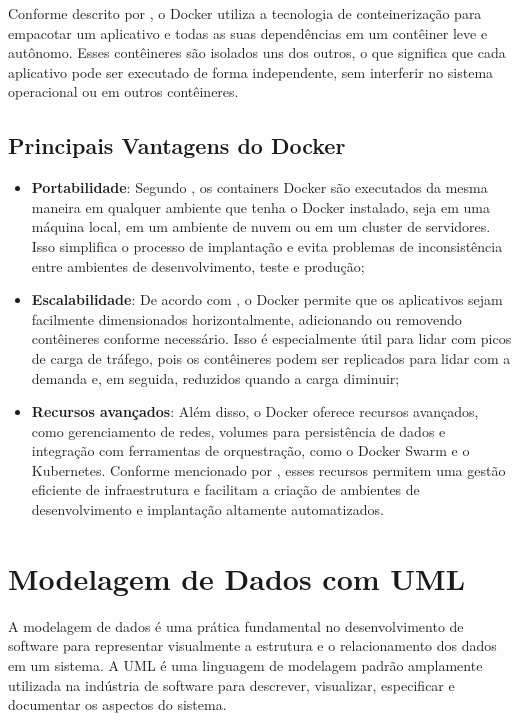 Conforme descrito por \cite{Boettiger2015}, o Docker utiliza a tecnologia de conteinerização para empacotar um aplicativo e todas as suas dependências em um contêiner leve e
autônomo. Esses contêineres são isolados uns dos outros, o que significa que cada aplicativo
pode ser executado de forma independente, sem interferir no sistema operacional ou em outros
contêineres.

\subsection*{Principais Vantagens do Docker}

\begin{itemize}
    \item \textbf{Portabilidade}: Segundo \cite{turner2019docker}, os containers Docker são executados da mesma maneira em qualquer ambiente que tenha o Docker instalado, seja em uma máquina local, em um ambiente de nuvem ou em um cluster de servidores. Isso simplifica o processo de implantação e evita problemas de inconsistência entre ambientes de desenvolvimento, teste e produção;

    \item \textbf{Escalabilidade}: De acordo com \cite{Muller2018}, o Docker permite que os aplicativos sejam facilmente dimensionados horizontalmente, adicionando ou removendo contêineres conforme necessário. Isso é especialmente útil para lidar com picos de carga de tráfego, pois os contêineres podem ser replicados para lidar com a demanda e, em seguida, reduzidos quando a carga diminuir;

    \item \textbf{Recursos avançados}: Além disso, o Docker oferece recursos avançados, como gerenciamento de redes, volumes para persistência de dados e integração com ferramentas de orquestração, como o Docker Swarm e o Kubernetes. Conforme mencionado por \cite{Matsumoto2017}, esses recursos permitem uma gestão eficiente de infraestrutura e facilitam a criação de ambientes de desenvolvimento e implantação altamente automatizados.
\end{itemize}

\section*{Modelagem de Dados com UML}

A modelagem de dados é uma prática fundamental no desenvolvimento de software para
representar visualmente a estrutura e o relacionamento dos dados em um sistema. A UML é uma
linguagem de modelagem padrão amplamente utilizada na indústria de software para descrever,
visualizar, especificar e documentar os aspectos do sistema.


